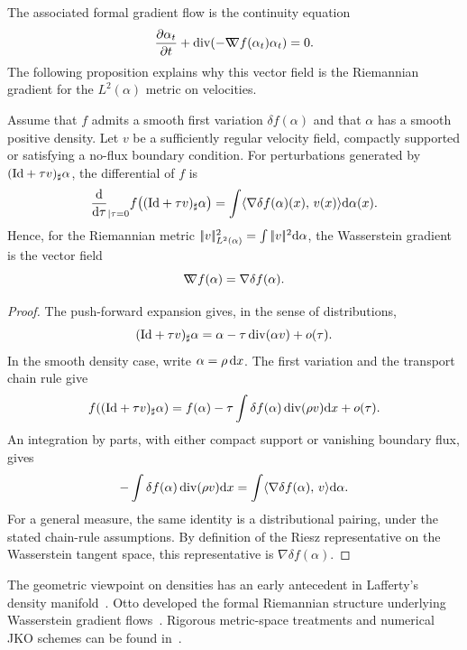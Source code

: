 The associated formal gradient flow is the continuity equation
\begin{equation}
    \frac{\partial \alpha_t}{\partial t} + \operatorname{div}(-\mathord{\nabla\mkern-9.3mu\nabla} f(\alpha_t) \alpha_t) = 0. \label{eq:wassflow-pde}
\end{equation}
The following proposition explains why this vector field is the Riemannian gradient for the $L^2(\alpha)$ metric on velocities.
%
\begin{proposition}\label{prop-formal-wass-gradient}
	Assume that $f$ admits a smooth first variation $\delta f(\alpha)$ and that $\alpha$ has a smooth positive density. Let $v$ be a sufficiently regular velocity field, compactly supported or satisfying a no-flux boundary condition. For perturbations generated by $(\mathrm{Id}+\tau v)_\sharp\alpha$, the differential of $f$ is
	\[
		\frac{\mathrm{d}}{\mathrm{d}\tau}_{|\tau=0}
		f\big((\mathrm{Id}+\tau v)_\sharp\alpha\big)
		=
		\int \langle \nabla \delta f(\alpha)(x),\,v(x)\rangle\mathrm{d}\alpha(x).
	\]
	Hence, for the Riemannian metric $|\!| v |\!|_{L^2(\alpha)}^2=\int |\!| v |\!|^2\mathrm{d}\alpha$, the Wasserstein gradient is the vector field
	\[
		\mathord{\nabla\mkern-9.3mu\nabla} f(\alpha)=\nabla \delta f(\alpha).
	\]
\end{proposition}
\begin{proof}
	The push-forward expansion gives, in the sense of distributions,
	\[
		(\mathrm{Id}+\tau v)_\sharp\alpha
		=
		\alpha-\tau\operatorname{div}(\alpha v)+o(\tau).
	\]
	In the smooth density case, write $\alpha=\rho\,\mathrm{d} x$. The first variation and the transport chain rule give
	\[
		f((\mathrm{Id}+\tau v)_\sharp\alpha)
		=
		f(\alpha)-\tau\int \delta f(\alpha)\operatorname{div}(\rho v)\mathrm{d} x+o(\tau).
	\]
	An integration by parts, with either compact support or vanishing boundary flux, gives
	\[
		-\int \delta f(\alpha)\operatorname{div}(\rho v)\mathrm{d} x
		=
		\int \langle \nabla\delta f(\alpha),\,v\rangle\mathrm{d}\alpha.
	\]
	For a general measure, the same identity is a distributional pairing, under the stated chain-rule assumptions. By definition of the Riesz representative on the Wasserstein tangent space, this representative is $\nabla\delta f(\alpha)$.
\end{proof}

The geometric viewpoint on densities has an early antecedent in Lafferty's density manifold~\citep{Lafferty1988DensityManifold}. Otto developed the formal Riemannian structure underlying Wasserstein gradient flows~\citep{otto2001geometry}. Rigorous metric-space treatments and numerical JKO schemes can be found in~\citet{ambrosio2006gradient,JDB-JKO,2015-Peyre-siims,gallouet2017jko}.

